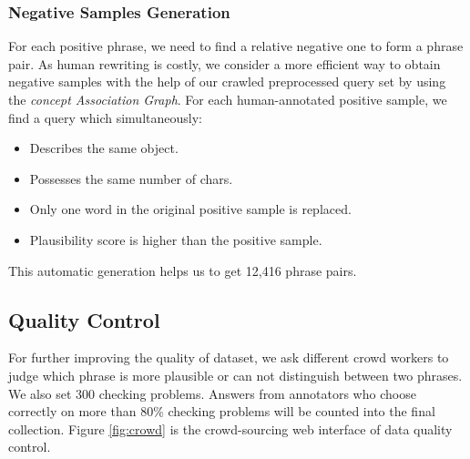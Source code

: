 \subsubsection{Negative Samples Generation}
For each positive phrase, we need to find a relative negative one to form a phrase pair. As human rewriting is costly, 
we consider a more efficient way to obtain negative samples with the help of our crawled preprocessed query set by using the \textit{concept Association Graph}.
For each human-annotated positive sample, we find a query which simultaneously:%
\begin{itemize}
	\item Describes the same object.
	\item Possesses the same number of chars.
	\item Only one word in the original positive sample is replaced. %
	\item Plausibility score is higher than the positive sample.
\end{itemize}

This automatic generation helps us to get 12,416 phrase pairs.%

\subsection{Quality Control}
For further improving the quality of dataset, we ask different crowd workers to judge which phrase is more plausible or can not distinguish between two phrases. We also set 300 checking problems. %
Answers from annotators who choose correctly on more than 80\% checking problems will be counted into the final collection. Figure \ref{fig:crowd} is the crowd-sourcing web interface of data quality control.%

